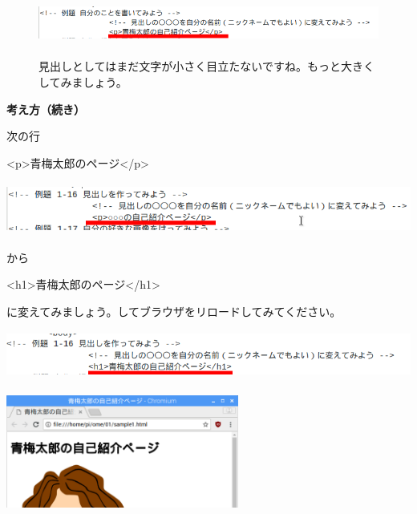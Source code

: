 \documentclass[a4paper,12pt]{jarticle}
\begin{document}
\begin{figure}[ht]
\begin{minipage}{16.576cm}
    \bigskip

    \includegraphics[width=14.907cm,height=1.423cm]{textbook-img155.png}


    \bigskip


    見出しとしてはまだ文字が小さく目立たないですね。もっと大きくしてみましょう。




    \bigskip
  \end{minipage}

\end{figure}

\clearpage
\flushleft
\textbf{考え方（続き）}




次の行

{\textless}p{\textgreater}青梅太郎のページ{\textless}/p{\textgreater}

\bigskip

\includegraphics[width=16.217cm,height=1.739cm]{textbook-img158.png}

から

{\textless}h1{\textgreater}青梅太郎のページ{\textless}/h1{\textgreater}

に変えてみましょう。してブラウザをリロードしてみてください。


\bigskip

\includegraphics[width=15.18cm,height=1.528cm]{textbook-img157.png}


\bigskip


\bigskip

\includegraphics[width=7.638cm,height=3.939cm]{textbook-img156.png}
\end{document}

